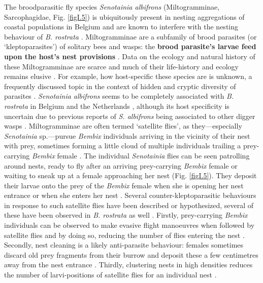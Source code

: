 \documentclass[10pt, twoside]{book} %
\begin{document}
	The broodparasitic fly species \textit{Senotainia albifrons} (Miltogramminae, Sarcophagidae, Fig. \ref{figI.5}) is ubiquitously present in nesting aggregations of coastal populations in Belgium and are known to interfere with the nesting behaviour of \textit{B. rostrata} \citep{peeters2008, gallin2021}. Miltogramminae are a subfamily of brood parasites (or `kleptoparasites') of solitary bees and wasps: the \textbf{brood parasite's larvae feed upon the host's nest provisions} \citep{evans2007}. Data on the ecology and natural history of these Miltogramminae are scarce and much of their life-history and ecology remains elusive \citep{polidori2009a}. For example, how host-specific these species are is unknown, a frequently discussed topic in the context of hidden and cryptic diversity of parasites \citep{smith2008, smit2020, benda2021}. \textit{Senotainia albifrons} seems to be completely associated with \textit{B. rostrata} in Belgium and the Netherlands \citep[personal communication, Liekele Sijstermans;][]{gallin2021}, although its host specificity is uncertain due to previous reports of \textit{S. albifrons} being associated to other digger wasps \citep[e.g.][]{zolda2001}. Miltogramminae are often termed `satellite flies', as they---especially \textit{Senotainia} sp.---pursue \textit{Bembix} individuals arriving in the vicinity of their nest with prey, sometimes forming a little cloud of multiple individuals trailing a prey-carrying \textit{Bembix} female \citep{evans2007, peeters2008, polidori2009a}. The individual \textit{Senotainia} flies can be seen patrolling around nests, ready to fly after an arriving prey-carrying \textit{Bembix} female or waiting to sneak up at a female approaching her nest (Fig. \ref{figI.5}). They deposit their larvae \citep[ovi-larviposition;][]{piwczynski2017} onto the prey of the \textit{Bembix} female when she is opening her nest entrance or when she enters her nest \citep{evans2007}. Several counter-kleptoparasitic behaviours in response to such satellite flies have been described or hypothesized, several of these have been observed in \textit{B. rostrata} as well \citep{larsson1986, spofford1992}. Firstly, prey-carrying \textit{Bembix} individuals can be observed to make evasive flight manoeuvres when followed by satellite flies and by doing so, reducing the number of flies entering the nest \citep{polidori2009a}. Secondly, nest cleaning is a likely anti-parasite behaviour: females sometimes discard old prey fragments from their burrow and deposit these a few centimetres away from the nest entrance \citep{nielsen1945, evans1957, evans2007}. Thirdly, clustering nests in high densities reduces the number of larvi-positions of satellite flies for an individual nest \citep{larsson1986}.\\
	
\end{document}

